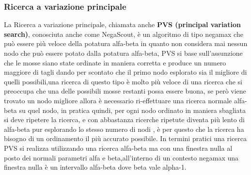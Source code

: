  


\subsubsection{Ricerca a variazione principale}
La Ricerca a variazione principale, chiamata anche \textbf{PVS (principal variation search)}, conosciuta anche come NegaScout, è un algoritmo di tipo negamax che può essere più veloce della potatura alfa-beta 
in quanto non considera  mai nessun nodo che può essere potato dalla potatura alfa-beta, PVS si base sull'assunzione che le mosse siano state ordinate in maniera corretta e produce un numero maggiore di tagli
dando per scontato che il primo nodo esplorato sia il migliore di quelli possibili,una ricerca di questo tipo è molto più veloce di una ricerca che si preoccupa che una delle possibili mosse restanti possa essere 
buona, se però viene trovato un nodo migliore allora è necessario ri-effettuare una ricerca normale alfa-beta su quel nodo, in pratica quindi, per ogni nodo ordinato in maniera sbagliata si deve ripetere la ricerca, e 
con abbastanza ricerche ripetute diventa più lento di alfa-beta pur esplorando lo stesso numero di nodi , è per questo che la ricerca ha bisogno di un ordinamento il più accurato possibile.
In termini pratici una ricerca PVS si realizza utilizzando una ricerca alfa-beta ma con una finestra nulla al posto dei normali parametri alfa e beta,all'interno di un contesto negamax una finestra nulla è un 
intervallo alfa-beta dove beta vale alpha-1.



